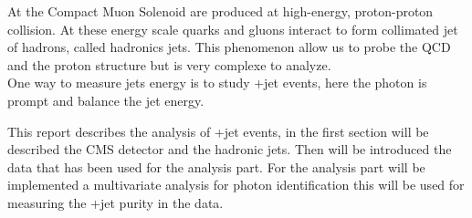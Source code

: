 
At the Compact Muon Solenoid are produced at high-energy, proton-proton collision. At these energy scale quarks and
gluons interact to form collimated jet of hadrons, called hadronics jets.
This phenomenon allow us to probe the QCD and the proton structure but is very complexe to analyze.\\
One way to measure jets energy is to study \textgamma+jet events, here the photon is prompt and balance the jet energy.

This report describes the analysis of \textgamma+jet events, in the first section will be described the CMS detector and
the hadronic jets. Then will be introduced the data that has been used for the analysis part.
For the analysis part will be implemented a multivariate analysis for photon identification this will be used for
measuring the \textgamma+jet purity in the data.

